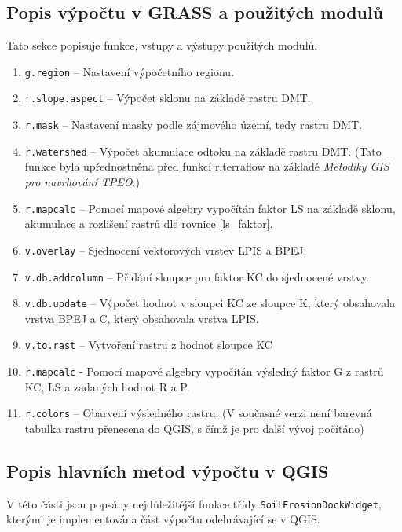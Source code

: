 \subsection{Popis výpočtu v GRASS a použitých modulů}
Tato sekce popisuje funkce, vstupy a výstupy použitých modulů.
\begin{enumerate}
	\item \texttt{g.region} – Nastavení výpočetního regionu.
	\item \texttt{r.slope.aspect} – Výpočet sklonu na základě rastru DMT.
	\item \texttt{r.mask} – Nastavení masky podle zájmového území, tedy rastru DMT.
	\item \texttt{r.watershed} – Výpočet akumulace odtoku na základě rastru DMT. (Tato funkce byla upřednostněna před funkcí r.terraflow na základě \textit{Metodiky GIS pro navrhování TPEO}\cite{Dostal2014}.)
	\item \texttt{r.mapcalc} – Pomocí mapové algebry vypočítán faktor LS na základě sklonu, akumulace a rozlišení rastrů dle rovnice \ref{ls_faktor}. 
	\item \texttt{v.overlay} – Sjednocení vektorových vrstev LPIS a BPEJ.
	\item \texttt{v.db.addcolumn} – Přidání sloupce pro faktor KC do sjednocené vrstvy.
	\item \texttt{v.db.update} – Výpočet hodnot v sloupci KC ze sloupce K, který obsahovala vrstva BPEJ a C, který obsahovala vrstva LPIS.
	\item \texttt{v.to.rast} – Vytvoření rastru z hodnot sloupce KC
	\item \texttt{r.mapcalc} - Pomocí mapové algebry vypočítán výsledný faktor G z rastrů KC, LS a zadaných hodnot R a P.
	\item \texttt{r.colors} – Obarvení výsledného rastru. (V současné verzi není barevná tabulka rastru přenesena do QGIS, s čímž je pro další vývoj počítáno)
\end{enumerate} 
\newpage
\subsection{Popis hlavních metod výpočtu v QGIS}
V této části jsou popsány nejdůležitější funkce třídy \texttt{SoilErosionDockWidget}, kterými je implementována část výpočtu odehrávající se v QGIS.
